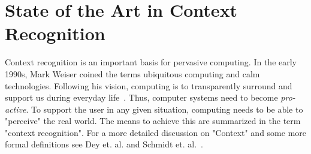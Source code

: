 


\section{State of the Art in Context Recognition}
\label{mot:sota}
Context recognition is an important basis for pervasive computing.
In the early 1990s, Mark Weiser coined the terms
ubiquitous computing and calm technologies. Following his vision, computing is to transparently surround and support
us during everyday life~\cite{Weiser:1996vf,Weiser:1993hb}.
Thus, computer systems need to become \textit{pro-active}. To support the user in any given situation, computing needs to be
able to "perceive" the real world. The means to achieve this are summarized
in the term "context recognition".  For a more detailed discussion on "Context" and some more formal definitions see Dey et. al. and Schmidt et. al.~\cite{Salber:1999uj,Schmidt:1999ut}.


